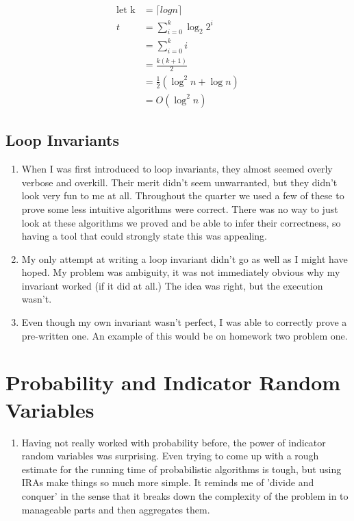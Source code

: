 \documentclass[a4paper,12pt]{article}
\newenvironment{indentpar}[1]%
{\begin{list}{}%
    {\setlength{\leftmargin}{#1}}%
  \item[]%
  }
  {\end{list}}
\begin{document}
\begin{enumerate}[]
\begin{indentpar}{0.5in}
    \begin{align*}
      \text{let k}& = \lceil log n \rceil\\
        t& = \sum_{i=0}^k \log_2 2^i\\
        & = \sum_{i=0}^k i\\
        & = \frac{k(k+1)}{2}\\
        & = \frac{1}{2}\left(\log^2 n + \log n\right) \\
        & = O(\log^2 n)
    \end{align*}
  \end{indentpar}

\end{enumerate}

\subsection*{Loop Invariants}

\begin{enumerate}[]

\item When I was first introduced to loop invariants, they almost
  seemed overly verbose and overkill. Their merit didn't seem
  unwarranted, but they didn't look very fun to me at all. Throughout
  the quarter we used a few of these to prove some less intuitive
  algorithms were correct. There was no way to just look at these
  algorithms we proved and be able to infer their correctness, so
  having a tool that could strongly state this was appealing.

\item My only attempt at writing a loop invariant didn't go as well as
  I might have hoped. My problem was ambiguity, it was not immediately
  obvious why my invariant worked (if it did at all.) The idea was
  right, but the execution wasn't.

\item Even though my own invariant wasn't perfect, I was able to
  correctly prove a pre-written one. An example of this would be on
  homework two problem one.
  
\end{enumerate}

\section*{Probability and Indicator Random Variables}

\begin{enumerate}[]

\item Having not really worked with probability before, the power of
  indicator random variables was surprising. Even trying to come up
  with a rough estimate for the running time of probabilistic
  algorithms is tough, but using IRAs make things so much more
  simple. It reminds me of 'divide and conquer' in the sense that it
  breaks down the complexity of the problem in to manageable parts and
  then aggregates them.

\end{enumerate}
\end{document}
